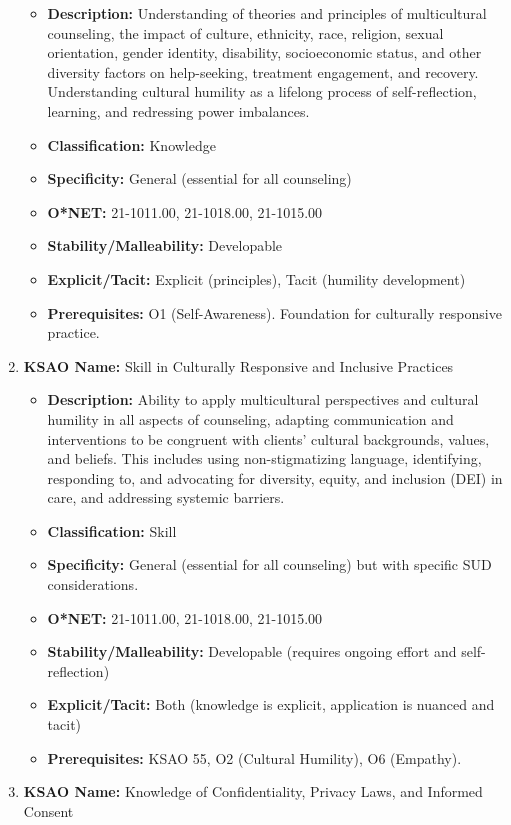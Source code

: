\documentclass[
  letterpaper,
  DIV=11,
  numbers=noendperiod]{scrartcl}
\providecommand{\tightlist}{%
  \setlength{\itemsep}{0pt}\setlength{\parskip}{0pt}}
\begin{document}
\begin{enumerate}
  \begin{itemize}
  \tightlist
  \item
    \textbf{Description:} Understanding of theories and principles of
    multicultural counseling, the impact of culture, ethnicity, race,
    religion, sexual orientation, gender identity, disability,
    socioeconomic status, and other diversity factors on help-seeking,
    treatment engagement, and recovery. Understanding cultural humility
    as a lifelong process of self-reflection, learning, and redressing
    power imbalances.
  \item
    \textbf{Classification:} Knowledge
  \item
    \textbf{Specificity:} General (essential for all counseling)
  \item
    \textbf{O*NET:} 21-1011.00, 21-1018.00, 21-1015.00
  \item
    \textbf{Stability/Malleability:} Developable
  \item
    \textbf{Explicit/Tacit:} Explicit (principles), Tacit (humility
    development)
  \item
    \textbf{Prerequisites:} O1 (Self-Awareness). Foundation for
    culturally responsive practice.
  \end{itemize}
\item
  \textbf{KSAO Name:} Skill in Culturally Responsive and Inclusive
  Practices

  \begin{itemize}
  \tightlist
  \item
    \textbf{Description:} Ability to apply multicultural perspectives
    and cultural humility in all aspects of counseling, adapting
    communication and interventions to be congruent with clients'
    cultural backgrounds, values, and beliefs. This includes using
    non-stigmatizing language, identifying, responding to, and
    advocating for diversity, equity, and inclusion (DEI) in care, and
    addressing systemic barriers.
  \item
    \textbf{Classification:} Skill
  \item
    \textbf{Specificity:} General (essential for all counseling) but
    with specific SUD considerations.
  \item
    \textbf{O*NET:} 21-1011.00, 21-1018.00, 21-1015.00
  \item
    \textbf{Stability/Malleability:} Developable (requires ongoing
    effort and self-reflection)
  \item
    \textbf{Explicit/Tacit:} Both (knowledge is explicit, application is
    nuanced and tacit)
  \item
    \textbf{Prerequisites:} KSAO 55, O2 (Cultural Humility), O6
    (Empathy).
  \end{itemize}
\item
  \textbf{KSAO Name:} Knowledge of Confidentiality, Privacy Laws, and
  Informed Consent


\end{enumerate}
\end{document}
